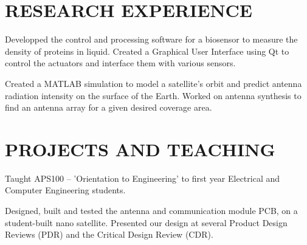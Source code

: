 \documentclass{ResumeTemplate}
\begin{document}
	\section{RESEARCH EXPERIENCE}
	

	\workitemstwo
	{Developped the control and processing software for a biosensor to measure the density of proteins in liquid.}
	{Created a Graphical User Interface using Qt to control the actuators and interface them with various sensors.}
	

	\workitemsone
	{Created a MATLAB simulation to model a satellite's orbit and predict antenna radiation intensity on the surface of the Earth. Worked on antenna synthesis to find an antenna array for a given desired coverage area.}
	
	\section{PROJECTS AND TEACHING}
	

	\workitemsone
	{Taught APS100 -- 'Orientation to Engineering' to first year Electrical and Computer Engineering students.}
	

	\workitemstwo
	{Designed, built and tested the antenna and communication module PCB, on a student-built nano satellite.}
	{Presented our design at several Product Design Reviews (PDR) and the Critical Design Review (CDR).}

	
\end{document}
